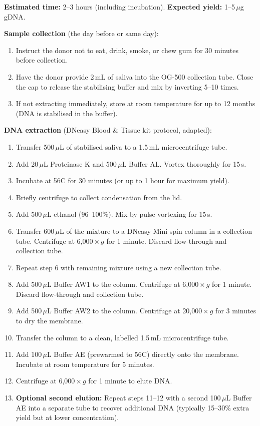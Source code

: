 \begin{protocolbox}[title={Protocol: DNA Extraction from Human Saliva}]
\textbf{Estimated time:} 2--3 hours (including incubation). \textbf{Expected yield:} 1--5\,$\mu$g gDNA.

\textbf{Sample collection} (the day before or same day):
\begin{enumerate}[nosep]
  \item Instruct the donor not to eat, drink, smoke, or chew gum for 30 minutes before collection.
  \item Have the donor provide 2\,mL of saliva into the OG-500 collection tube. Close the cap to release the stabilising buffer and mix by inverting 5--10 times.
  \item If not extracting immediately, store at room temperature for up to 12 months (DNA is stabilised in the buffer).
\end{enumerate}

\textbf{DNA extraction} (DNeasy Blood \& Tissue kit protocol, adapted):
\begin{enumerate}[nosep]
  \item Transfer 500\,$\mu$L of stabilised saliva to a 1.5\,mL microcentrifuge tube.
  \item Add 20\,$\mu$L Proteinase K and 500\,$\mu$L Buffer AL. Vortex thoroughly for 15\,s.
  \item Incubate at 56\textdegree C for 30 minutes (or up to 1 hour for maximum yield).
  \item Briefly centrifuge to collect condensation from the lid.
  \item Add 500\,$\mu$L ethanol (96--100\%). Mix by pulse-vortexing for 15\,s.
  \item Transfer 600\,$\mu$L of the mixture to a DNeasy Mini spin column in a collection tube. Centrifuge at 6,000\,$\times$\,$g$ for 1 minute. Discard flow-through and collection tube.
  \item Repeat step 6 with remaining mixture using a new collection tube.
  \item Add 500\,$\mu$L Buffer AW1 to the column. Centrifuge at 6,000\,$\times$\,$g$ for 1 minute. Discard flow-through and collection tube.
  \item Add 500\,$\mu$L Buffer AW2 to the column. Centrifuge at 20,000\,$\times$\,$g$ for 3 minutes to dry the membrane.
  \item Transfer the column to a clean, labelled 1.5\,mL microcentrifuge tube.
  \item Add 100\,$\mu$L Buffer AE (prewarmed to 56\textdegree C) directly onto the membrane. Incubate at room temperature for 5 minutes.
  \item Centrifuge at 6,000\,$\times$\,$g$ for 1 minute to elute DNA.
  \item \textbf{Optional second elution:} Repeat steps 11--12 with a second 100\,$\mu$L Buffer AE into a separate tube to recover additional DNA (typically 15--30\% extra yield but at lower concentration).
\end{enumerate}


\end{protocolbox}
